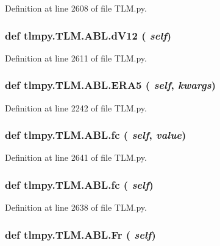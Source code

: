Definition at line 2608 of file TLM.py.\hypertarget{classtlmpy_1_1TLM_1_1ABL_a18d392d5c5a37fd6aadc68605cb40e24}{
\subsubsection[{dV12}]{\setlength{\rightskip}{0pt plus 5cm}def tlmpy.TLM.ABL.dV12 ( {\em self})}}
\label{classtlmpy_1_1TLM_1_1ABL_a18d392d5c5a37fd6aadc68605cb40e24}


Definition at line 2611 of file TLM.py.\hypertarget{classtlmpy_1_1TLM_1_1ABL_a3ac0ae6e88d3d597b90b37e7c55bc888}{
\subsubsection[{ERA5}]{\setlength{\rightskip}{0pt plus 5cm}def tlmpy.TLM.ABL.ERA5 ( {\em self}, \/   {\em kwargs})}}
\label{classtlmpy_1_1TLM_1_1ABL_a3ac0ae6e88d3d597b90b37e7c55bc888}


Definition at line 2242 of file TLM.py.\hypertarget{classtlmpy_1_1TLM_1_1ABL_a8d62692fe29d1e13d6bcf993daa5f359}{
\subsubsection[{fc}]{\setlength{\rightskip}{0pt plus 5cm}def tlmpy.TLM.ABL.fc ( {\em self}, \/   {\em value})}}
\label{classtlmpy_1_1TLM_1_1ABL_a8d62692fe29d1e13d6bcf993daa5f359}


Definition at line 2641 of file TLM.py.\hypertarget{classtlmpy_1_1TLM_1_1ABL_a8d62692fe29d1e13d6bcf993daa5f359}{
\subsubsection[{fc}]{\setlength{\rightskip}{0pt plus 5cm}def tlmpy.TLM.ABL.fc ( {\em self})}}
\label{classtlmpy_1_1TLM_1_1ABL_a8d62692fe29d1e13d6bcf993daa5f359}


Definition at line 2638 of file TLM.py.\hypertarget{classtlmpy_1_1TLM_1_1ABL_a354243a0d0091ff69f0680832d172fb3}{
\subsubsection[{Fr}]{\setlength{\rightskip}{0pt plus 5cm}def tlmpy.TLM.ABL.Fr ( {\em self})}}
\label{classtlmpy_1_1TLM_1_1ABL_a354243a0d0091ff69f0680832d172fb3}


